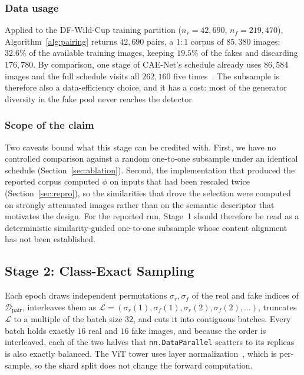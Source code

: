 \documentclass[10pt,journal]{IEEEtran}
\begin{document}
\subsubsection{Data usage}
Applied to the DF-Wild-Cup training partition ($n_r=42{,}690$,
$n_f=219{,}470$), Algorithm~\ref{alg:pairing} returns $42{,}690$ pairs, a
$1{:}1$ corpus of $85{,}380$ images: $32.6\%$ of the available training images,
keeping $19.5\%$ of the fakes and discarding $176{,}780$. By comparison, one
stage of CAE-Net's schedule already uses $86{,}584$ images and the full
schedule visits all $262{,}160$ five times~\cite{bhattacharjee2026caenet}. The
subsample is therefore also a data-efficiency choice, and it has a cost: most
of the generator diversity in the fake pool never reaches the detector.

\subsubsection{Scope of the claim}
Two caveats bound what this stage can be credited with. First, we have no
controlled comparison against a random one-to-one subsample under an identical
schedule (Section~\ref{sec:ablation}). Second, the implementation that
produced the reported corpus computed $\phi$ on inputs that had been rescaled
twice (Section~\ref{sec:repro}), so the similarities that drove the selection
were computed on strongly attenuated images rather than on the semantic
descriptor that motivates the design. For the reported run, Stage~1 should
therefore be read as a deterministic similarity-guided one-to-one subsample
whose content alignment has not been established.

\subsection{Stage 2: Class-Exact Sampling}\label{sec:sampler}
Each epoch draws independent permutations $\sigma_r,\sigma_f$ of the real and
fake indices of $\mathcal{D}_{\mathrm{pair}}$, interleaves them as
$\mathcal{L}=(\sigma_r(1),\sigma_f(1),\sigma_r(2),\sigma_f(2),\dots)$, truncates
$\mathcal{L}$ to a multiple of the batch size $32$, and cuts it into
contiguous batches. Every batch holds exactly $16$ real and $16$ fake images,
and because the order is interleaved, each of the two halves that
\texttt{nn.DataParallel} scatters to its replicas is also exactly balanced.
The ViT tower uses layer normalization~\cite{ba2016layernorm}, which is
per-sample, so the shard split does not change the forward computation.
\end{document}
